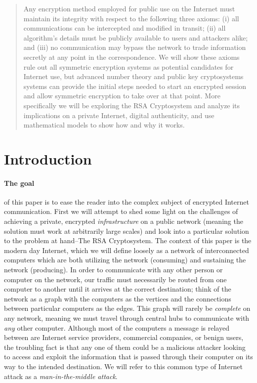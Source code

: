 \documentclass[12pt]{article}
\theoremstyle{remark}
\begin{document}
\maketitle

\begin{abstract}
Any encryption method employed for public use on the Internet must maintain its integrity with respect to the following three axioms: (i) all communications can be intercepted and modified in transit; (ii) all algorithm's details must be publicly available to users and attackers alike; and (iii) no communication may bypass the network to trade information secretly at any point in the correspondence.  We will show these axioms rule out all symmetric encryption systems as potential candidates for Internet use, but advanced number theory and public key cryptosystems systems can provide the initial steps needed to start an encrypted session and allow symmetric encryption to take over at that point.  More specifically we will be exploring the RSA Cryptosystem and analyze its implications on a private Internet, digital authenticity, and use mathematical models to show how and why it works.  
\end{abstract}



\section{Introduction}

\paragraph{The goal} of this paper is to ease the reader into the complex subject of encrypted Internet communication.  First we will attempt to shed some light on the challenges of achieving a private, encrypted \textit{infrastructure} on a public network (meaning the solution must work at arbitrarily large scales) and look into a particular solution to the problem at hand--The RSA Cryptosystem.  The context of this paper is the modern day Internet, which we will define loosely as a network of interconnected computers which are both utilizing the network (consuming) and sustaining the network (producing).  In order to communicate with any other person or computer on the network, our traffic must necessarily be routed from one computer to another until it arrives at the correct destination; think of the network as a graph with the computers as the vertices and the connections between particular computers as the edges.  This graph will rarely be \textit{complete} on any network, meaning we must travel through central hubs to communicate with \emph{any} other computer.  Although most of the computers a message is relayed between are Internet service providers, commercial companies, or benign users, the troubling fact is that any one of them could be a malicious attacker looking to access and exploit the information that is passed through their computer on its way to the intended destination.  We will refer to this common type of Internet attack as a \textit{man-in-the-middle attack}.
\end{document}

